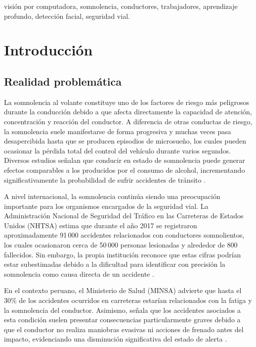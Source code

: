 \documentclass[conference]{IEEEtran}
\begin{document}
\begin{IEEEkeywords}
visión por computadora, somnolencia, conductores, trabajadores, aprendizaje profundo, detección facial, seguridad vial.
\end{IEEEkeywords}

\section{Introducción}

\subsection{Realidad problemática}

La somnolencia al volante constituye uno de los factores de riesgo más peligrosos durante la conducción debido a que afecta directamente la capacidad de atención, concentración y reacción del conductor. A diferencia de otras conductas de riesgo, la somnolencia suele manifestarse de forma progresiva y muchas veces pasa desapercibida hasta que se producen episodios de microsueño, los cuales pueden ocasionar la pérdida total del control del vehículo durante varios segundos. Diversos estudios señalan que conducir en estado de somnolencia puede generar efectos comparables a los producidos por el consumo de alcohol, incrementando significativamente la probabilidad de sufrir accidentes de tránsito \parencite{nhtsa2024}.

A nivel internacional, la somnolencia continúa siendo una preocupación importante para los organismos encargados de la seguridad vial. La Administración Nacional de Seguridad del Tráfico en las Carreteras de Estados Unidos (NHTSA) estima que durante el año 2017 se registraron aproximadamente 91\,000 accidentes relacionados con conductores somnolientos, los cuales ocasionaron cerca de 50\,000 personas lesionadas y alrededor de 800 fallecidos. Sin embargo, la propia institución reconoce que estas cifras podrían estar subestimadas debido a la dificultad para identificar con precisión la somnolencia como causa directa de un accidente \parencite{nhtsa2024}.

En el contexto peruano, el Ministerio de Salud (MINSA) advierte que hasta el 30\% de los accidentes ocurridos en carreteras estarían relacionados con la fatiga y la somnolencia del conductor. Asimismo, señala que los accidentes asociados a esta condición suelen presentar consecuencias particularmente graves debido a que el conductor no realiza maniobras evasivas ni acciones de frenado antes del impacto, evidenciando una disminución significativa del estado de alerta \parencite{minsa2017}.
\end{document}
